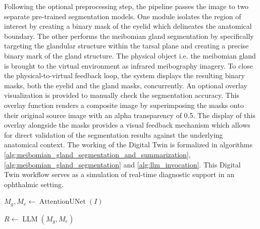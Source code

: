 \documentclass{article}
\begin{document}
Following the optional preprocessing step, the pipeline passes the image to two separate pre-trained segmentation models. One module isolates the region of interest by creating a binary mask of the eyelid which delineates the anatomical boundary. The other performs the meibomian gland segmentation by specifically targeting the glandular structure within the tarsal plane and creating a precise binary mark of the gland structure. The physical object i.e. the meibomian gland is brought to the virtual environment as infrared meibography imagery. To close the physical-to-virtual feedback loop, the system displays the resulting binary masks, both the eyelid and the gland masks, concurrently. An optional overlay visualization is provided to manually check the segmentation accuracy. This overlay function renders a composite image by superimposing the masks onto their original source image with an alpha transparency of 0.5. The display of this overlay alongside the masks provides a visual feedback mechanism which allows for direct validation of the segmentation results against the underlying anatomical context. The working of the Digital Twin is formalized in algorithms \ref{alg:meibomian_gland_segmentation_and_summarization}, \ref{alg:meibomian_gland_segmentation}  and \ref{alg:llm_invocation}. This Digital Twin workflow serves as a simulation of real-time diagnostic support in an ophthalmic setting.





%

\begin{algorithm}[H]
    \caption{Algorithm for Meibomian Gland Segmentation and Report Generation}
    \label{alg:meibomian_gland_segmentation_and_summarization}


    $M_g, M_e \gets \operatorname{AttentionUNet}(I)$\;

    $R \gets \operatorname{LLM}(M_g, M_e)$\;


\end{algorithm}
\end{document}
